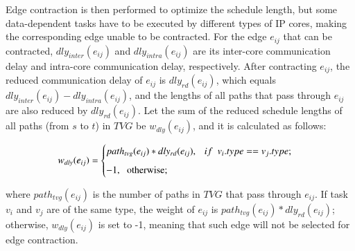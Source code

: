 \documentclass[10pt,journal, compsoc]{IEEEtran}
\begin{document}

Edge contraction is then performed to optimize the schedule length, but some data-dependent tasks have to be executed by different types of IP cores, making the corresponding edge unable to be contracted. For the edge $e_{ij}$ that can be contracted, $dly_{inter}(e_{ij})$ and $dly_{intra}(e_{ij})$ are its inter-core communication delay and intra-core communication delay, respectively. After contracting $e_{ij}$, the reduced communication delay of $e_{ij}$ is $dly_{rd}(e_{ij})$, which equals $dly_{inter}(e_{ij})-dly_{intra}(e_{ij})$, and the lengths of all paths that pass through $e_{ij}$ are also reduced by $dly_{rd}(e_{ij})$. Let the sum of the reduced schedule lengths of all paths (from $s$ to $t$) in $TVG$ be $w_{dly}(e_{ij})$, and it is calculated as follows:



\begin{eqnarray*}
	\begin{split}
		w_{dly}(e_{ij})=
		\begin{cases}
			path_{tvg}(e_{ij})*dly_{rd}(e_{ij}),  ~~~if~~v_i.type==v_j.type; \\[0.5em]
			 -1, ~~~$otherwise$; \\
		\end{cases}
	\end{split}
	\label{pro1}
\end{eqnarray*}

\noindent where $path_{tvg}(e_{ij})$ is the number of paths in $TVG$ that pass through $e_{ij}$. If task $v_i$ and $v_j$ are of the same type, the weight of $e_{ij}$ is $path_{tvg}(e_{ij})*dly_{rd}(e_{ij})$; otherwise, $w_{dly}(e_{ij})$ is set to -1, meaning that such edge will not be selected for edge contraction.
\end{document}
